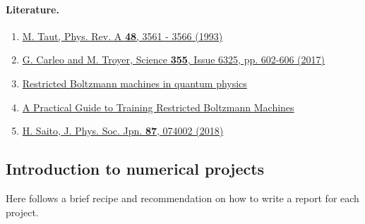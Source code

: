 \documentclass[%
oneside,                 %
final,                   %
10pt]{article}
\begin{document}
\paragraph{Literature.}
\begin{enumerate}
 \item \href{{https://journals.aps.org/pra/abstract/10.1103/PhysRevA.48.3561}}{M. Taut, Phys. Rev. A \textbf{48}, 3561 - 3566 (1993)}

 \item \href{{http://science.sciencemag.org/content/355/6325/602}}{G. Carleo and M. Troyer, Science \textbf{355}, Issue 6325, pp. 602-606 (2017)}

 \item \href{{https://www.nature.com/articles/s41567-019-0545-1}}{Restricted Boltzmann machines in quantum physics}

 \item \href{{https://www.cs.toronto.edu/~hinton/absps/guideTR.pdf}}{A Practical Guide to Training Restricted Boltzmann Machines}

 \item \href{{https://journals.jps.jp/doi/10.7566/JPSJ.87.074002}}{H. Saito, J. Phys. Soc. Jpn. \textbf{87}, 074002 (2018)}
\end{enumerate}

\noindent
\subsection{Introduction to numerical projects}

Here follows a brief recipe and recommendation on how to write a report for each
project.
\end{document}
